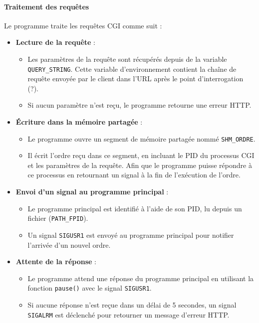 \documentclass[a4paper, 11pt, french]{article}
\begin{document}
\paragraph{Traitement des requêtes}
Le programme traite les requêtes CGI comme suit :
\begin{itemize}
    \item \textbf{Lecture de la requête} :
    \begin{itemize}
        \item Les paramètres de la requête sont récupérés depuis de la variable \texttt{QUERY\_STRING}. Cette variable d'environnement contient la chaîne de requête envoyée par le client dans l'URL après le point d'interrogation (?).
        \item Si aucun paramètre n'est reçu, le programme retourne une erreur HTTP.
    \end{itemize}
    \item \textbf{Écriture dans la mémoire partagée} :
    \begin{itemize}
        \item Le programme ouvre un segment de mémoire partagée nommé \texttt{SHM\_ORDRE}.
        \item Il écrit l'ordre reçu dans ce segment, en incluant le PID du processus CGI et les paramètres de la requête. Afin que le programme puisse répondre à ce processus en retournant un signal à la fin de l'exécution de l'ordre.
    \end{itemize}
    \item \textbf{Envoi d'un signal au programme principal} :
    \begin{itemize}
        \item Le programme principal est identifié à l'aide de son PID, lu depuis un fichier (\texttt{PATH\_FPID}).
        \item Un signal \texttt{SIGUSR1} est envoyé au programme principal pour notifier l'arrivée d'un nouvel ordre.
    \end{itemize}
    \item \textbf{Attente de la réponse} :
    \begin{itemize}
        \item Le programme attend une réponse du programme principal en utilisant la fonction \texttt{pause()} avec le signal \texttt{SIGUSR1}.
        \item Si aucune réponse n'est reçue dans un délai de 5 secondes, un signal \texttt{SIGALRM} est déclenché pour retourner un message d'erreur HTTP.
    \end{itemize}
\end{itemize}
\end{document}
